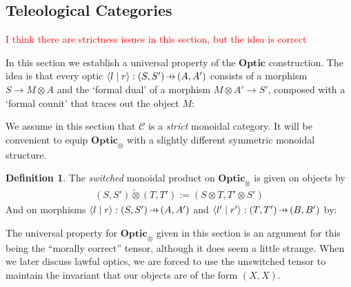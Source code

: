 \documentclass[11pt,letterpaper]{article}
\theoremstyle{plain}
\newtheorem{proposition}[theorem]{Proposition}
\theoremstyle{definition}
\newtheorem{definition}[theorem]{Definition}
\newcommand{\C}{\mathscr{C}}
\newcommand{\Optic}{\mathbf{Optic}}
\newcommand{\switched}{\mathbin{\tilde{\otimes}}}
\newcommand{\rep}[2]{{\ensuremath \left\langle #1 \mid #2 \right\rangle}}
\newcommand{\hto}{\ensuremath{\,\mathaccent\shortmid\rightarrow\,}}
\newcommand{\todo}[1]{\textcolor{red}{\small #1}}
\begin{document}

\subsection{Teleological Categories}\label{sec:teleological-categories}
\todo{I think there are strictness issues in this section, but the idea is correct}

In this section we establish a universal property of the $\Optic$ construction. The idea is that every optic $\rep{l}{r} : (S, S') \hto (A, A')$ consists of a morphism $S \to M \otimes A$ and the `formal dual' of a morphism $M \otimes A' \to S'$, composed with a `formal counit' that traces out the object $M$:
\begin{center}
  
\end{center}

We assume in this section that $\C$ is a \emph{strict} monoidal category. It will be convenient to equip $\Optic_\otimes$ with a slightly different symmetric monoidal structure.

\begin{definition}
  The \emph{switched} monoidal product on $\Optic_\otimes$ is given on objects by
  \begin{align*}
    (S, S') \switched (T, T') := (S \otimes T, T' \otimes S')
  \end{align*}
  And on morphisms $\rep{l}{r} : (S, S') \hto (A, A')$ and $\rep{l'}{r'} : (T, T') \hto (B, B')$ by:
  \begin{center}
    
  \end{center}
\end{definition}

The universal property for $\Optic_\otimes$ given in this section is an argument for this being the ``morally correct'' tensor, although it does seem a little strange. When we later discuss lawful optics, we are forced to use the unswitched tensor to maintain the invariant that our objects are of the form $(X, X)$.
\end{document}
